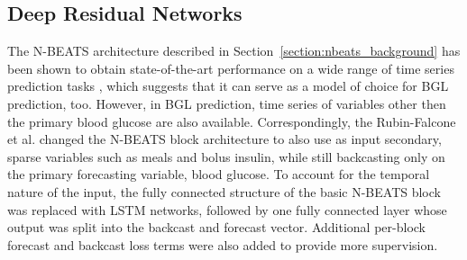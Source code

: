 \subsection{Deep Residual Networks}
\label{sec:nbeats}


The \ac{N-BEATS} architecture described in Section~\ref{section:nbeats_background} has been shown to obtain state-of-the-art performance on a wide range of time series prediction tasks \cite{oreshkin:nbeats}, which suggests that it can serve as a model of choice for \ac{BGL} prediction, too. However, in \ac{BGL} prediction, time series of variables other then the primary blood glucose are also available. Correspondingly, the Rubin-Falcone et al. \cite{rubin_falcone:nbeats_bgl} changed the \ac{N-BEATS} block architecture to also use as input secondary, sparse variables such as meals and bolus insulin, while still backcasting only on the primary forecasting variable, blood glucose. To account for the temporal nature of the input, the fully connected structure of the basic \ac{N-BEATS} block was replaced with \ac{LSTM} networks, followed by one fully connected layer whose output was split into the backcast and forecast vector. Additional per-block forecast and backcast loss terms were also added to provide more supervision.

